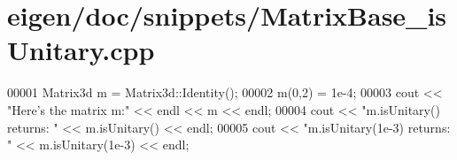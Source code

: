 \hypertarget{eigen_2doc_2snippets_2_matrix_base__is_unitary_8cpp_source}{}\section{eigen/doc/snippets/\+Matrix\+Base\+\_\+is\+Unitary.cpp}
\label{eigen_2doc_2snippets_2_matrix_base__is_unitary_8cpp_source}

\begin{DoxyCode}
00001 Matrix3d m = Matrix3d::Identity();
00002 m(0,2) = 1e-4;
00003 cout << \textcolor{stringliteral}{"Here's the matrix m:"} << endl << m << endl;
00004 cout << \textcolor{stringliteral}{"m.isUnitary() returns: "} << m.isUnitary() << endl;
00005 cout << \textcolor{stringliteral}{"m.isUnitary(1e-3) returns: "} << m.isUnitary(1e-3) << endl;
\end{DoxyCode}
